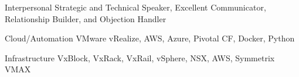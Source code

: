 


\begin{cvskills}


\cvskill
{Interpersonal} %
{Strategic and Technical Speaker, Excellent Communicator, Relationship Builder, and Objection Handler } %


\cvskill
{Cloud/Automation} %
{VMware vRealize, AWS, Azure, Pivotal CF, Docker, Python} %


\cvskill
{Infrastructure} %
{VxBlock, VxRack, VxRail, vSphere, NSX, AWS, Symmetrix VMAX} %


\end{cvskills}